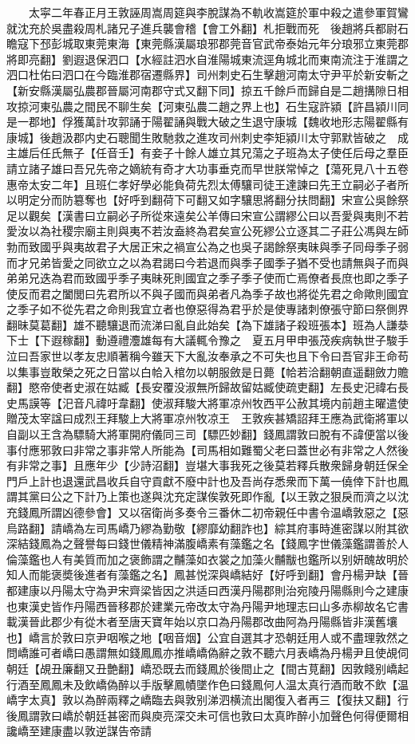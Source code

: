 　　太寜二年春正月王敦誣周嵩周筵與李脫謀為不軌收嵩筵於軍中殺之遣參軍賀鸞就沈充於吳盡殺周札諸兄子進兵襲會稽【會工外翻】札拒戰而死　後趙將兵都尉石瞻寇下邳彭城取東莞東海【東莞縣漢屬琅邪郡莞音官武帝泰始元年分琅邪立東莞郡將即亮翻】劉遐退保泗口【水經註泗水自淮陽城東流逕角城北而東南流注于淮謂之泗口杜佑曰泗口在今臨淮郡宿遷縣界】司州刺史石生擊趙河南太守尹平於新安斬之【新安縣漢屬弘農郡晉屬河南郡守式又翻下同】掠五千餘戶而歸自是二趙搆隙日相攻掠河東弘農之間民不聊生矣【河東弘農二趙之界上也】石生寇許潁【許昌潁川同是一郡地】俘獲萬計攻郭誦于陽翟誦與戰大破之生退守康城【魏收地形志陽翟縣有康城】後趙汲郡内史石聰聞生敗馳救之進攻司州刺史李矩潁川太守郭默皆破之　成主雄后任氏無子【任音壬】有妾子十餘人雄立其兄蕩之子班為太子使任后母之羣臣請立諸子雄曰吾兄先帝之嫡統有奇才大功事垂克而早世朕常悼之【蕩死見八十五卷惠帝太安二年】且班仁孝好學必能負荷先烈太傅驤司徒王達諫曰先王立嗣必子者所以明定分而防簒奪也【好呼到翻荷下可翻又如字驤思將翻分扶問翻】宋宣公吳餘祭足以觀矣【漢書曰立嗣必子所從來遠矣公羊傳曰宋宣公謂繆公曰以吾愛與夷則不若愛汝以為社稷宗廟主則與夷不若汝盍終為君矣宣公死繆公立逐其二子莊公馮與左師勃而致國乎與夷故君子大居正宋之禍宣公為之也吳子謁餘祭夷昧與季子同母季子弱而才兄弟皆愛之同欲立之以為君謁曰今若退而與季子國季子猶不受也請無與子而與弟弟兄迭為君而致國乎季子夷昧死則國宜之季子季子使而亡焉僚者長庶也即之季子使反而君之闔閭曰先君所以不與子國而與弟者凡為季子故也將從先君之命歟則國宜之季子如不從先君之命則我宜立者也僚惡得為君乎於是使專諸刺僚張守節曰祭側界翻昧莫葛翻】雄不聽驤退而流涕曰亂自此始矣【為下雄諸子殺班張本】班為人謙㳟下士【下遐稼翻】動遵禮灋雄每有大議輒令豫之　夏五月甲申張茂疾病執世子駿手泣曰吾家世以孝友忠順著稱今雖天下大亂汝奉承之不可失也且下令曰吾官非王命苟以集事豈敢榮之死之日當以白帢入棺勿以朝服斂是日薨【帢若洽翻朝直遥翻斂力贍翻】愍帝使者史淑在姑臧【長安覆没淑無所歸故留姑臧使疏吏翻】左長史汜禕右長史馬謨等【汜音凡禕吁韋翻】使淑拜駿大將軍凉州牧西平公赦其境内前趙主曜遣使贈茂太宰諡曰成烈王拜駿上大將軍凉州牧凉王　王敦疾甚矯詔拜王應為武衛將軍以自副以王含為驃騎大將軍開府儀同三司【驃匹妙翻】錢鳳謂敦曰脫有不諱便當以後事付應邪敦曰非常之事非常人所能為【司馬相如難蜀父老曰蓋世必有非常之人然後有非常之事】且應年少【少詩沼翻】豈堪大事我死之後莫若釋兵散衆歸身朝廷保全門戶上計也退還武昌收兵自守貢獻不廢中計也及吾尚存悉衆而下萬一僥倖下計也鳳謂其黨曰公之下計乃上策也遂與沈充定謀俟敦死即作亂【以王敦之狠戾而濟之以沈充錢鳳所謂凶德參會】又以宿衛尚多奏令三番休二初帝親任中書令温嶠敦惡之【惡烏路翻】請嶠為左司馬嶠乃繆為勤敬【繆靡幼翻詐也】綜其府事時進密謀以附其欲深結錢鳳為之聲譽每曰錢世儀精神滿腹嶠素有藻鑑之名【錢鳳字世儀藻鑑謂善於人倫藻鑑也人有美質而加之褒飾謂之黼藻如衣裳之加藻火黼黻也鑑所以别妍醜故明於知人而能褒奬後進者有藻鑑之名】鳳甚悦深與嶠結好【好呼到翻】會丹楊尹缺【晉都建康以丹陽太守為尹宋齊梁皆因之洪适曰西漢丹陽郡則治宛陵丹陽縣則今之建康也東漢史皆作丹陽西晉移郡於建業元帝改太守為丹陽尹地理志曰山多赤柳故名它書載漢晉此郡少有從木者至唐天寶年始以京口為丹陽郡改曲阿為丹陽縣皆非漢舊壤也】嶠言於敦曰京尹咽喉之地【咽音烟】公宜自選其才恐朝廷用人或不盡理敦然之問嶠誰可者嶠曰愚謂無如錢鳳鳳亦推嶠嶠偽辭之敦不聽六月表嶠為丹楊尹且使覘伺朝廷【覘丑廉翻又丑艶翻】嶠恐既去而錢鳳於後間止之【間古莧翻】因敦餞别嶠起行酒至鳳鳳未及飲嶠偽醉以手版擊鳳幘墜作色曰錢鳳何人温太真行酒而敢不飲【温嶠字太真】敦以為醉兩釋之嶠臨去與敦别涕泗横流出閣復入者再三【復扶又翻】行後鳳謂敦曰嶠於朝廷甚密而與庾亮深交未可信也敦曰太真昨醉小加聲色何得便爾相讒嶠至建康盡以敦逆謀告帝請